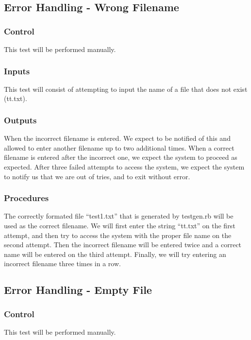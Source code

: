 \documentclass[]{article}
\begin{document}
\subsection{Error Handling - Wrong Filename}
	\subsubsection{Control}
	This test will be performed manually.
	
	\subsubsection{Inputs}
	This test will consist of attempting to input the name of a file that does not
	exist (tt.txt).
	
	\subsubsection{Outputs}
	When the incorrect filename is entered.  We expect to be notified of this and
	allowed to enter another filename up to two additional times.  When a correct
	filename is entered after the incorrect one, we expect the system to proceed as
	expected.  After three failed attempts to access the system, we expect the
	system to notify us that we are out of tries, and to exit without error.
	
	\subsubsection{Procedures}
	The correctly formated file ``test1.txt'' that is generated by testgen.rb will
	be used as the correct filename.   We will first enter the string ``tt.txt'' on
	the first attempt, and then try to access the system with the proper file name
	on the second attempt. Then the incorrect filename will be entered twice and a
	correct name will be entered on the third attempt. Finally, we will try 
	entering an incorrect filename three times in a row.
	

\subsection{Error Handling - Empty File}
	\subsubsection{Control}
	This test will be performed manually.
	
\end{document}
